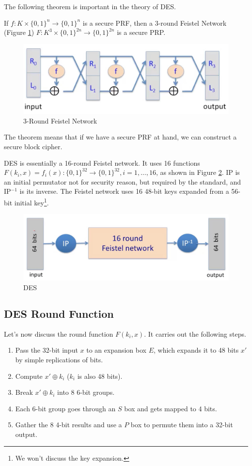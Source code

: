 The following theorem is important in the theory of DES. 
\begin{theorem}
If $f:K\times\{0,1\}^n\rightarrow\{0,1\}^n$ is a secure PRF, then a 3-round Feistel Network (Figure \ref{3rfeistel}) $F:K^3\times\{0,1\}^{2n}\rightarrow\{0,1\}^{2n}$ is a secure PRP.
\end{theorem}
\begin{figure}[ht]
\centering
\includegraphics[width=\textwidth]{3rfeistel.jpg}
\caption{3-Round Feistel Network}\label{3rfeistel}
\end{figure}
The theorem means that if we have a secure PRF at hand, we can construct a secure block cipher.

DES is essentially a 16-round Feistel network. It uses 16 functions $F(k_i,x)=f_i(x):\{0,1\}^{32}\rightarrow\{0,1\}^{32},i=1,\dots,16$, as shown in Figure \ref{des}. IP is an initial permutator not for security reason, but required by the standard, and IP$^{-1}$ is its inverse. The Feistel network uses 16 48-bit keys expanded from a 56-bit initial key\footnote{We won't discuss the key expansion.}.
\begin{figure}[ht]
\centering
\includegraphics[width=\textwidth]{DES.jpg}
\caption{DES}\label{des}
\end{figure}
\subsection{DES Round Function}
Let's now discuss the round function $F(k_i,x)$. It carries out the following steps.
\begin{enumerate}
\item Pass the 32-bit input $x$ to an expansion box $E$, which expands it to 48 bits $x'$ by simple replications of bits.
\item Compute $x'\oplus k_i$ ($k_i$ is also 48 bits).
\item Break $x'\oplus k_i$ into 8 6-bit groups.
\item Each 6-bit group goes through an $S$ box and gets mapped to 4 bits.
\item Gather the 8 4-bit results and use a $P$ box to permute them into a 32-bit output.  
\end{enumerate}

